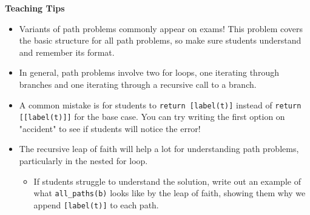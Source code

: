 \begin{guide}
\begin{blocksection}
  \textbf{Teaching Tips}
  \begin{itemize}
      \item Variants of path problems commonly appear on exams! This problem covers the basic structure for all path problems, so make sure students understand and remember its format.
      \item In general, path problems involve two for loops, one iterating through branches and one iterating through a recursive call to a branch.
      \item A common mistake is for students to \lstinline$return [label(t)]$ instead of \lstinline$return [[label(t)]]$ for the base case. You can try writing the first option on "accident" to see if students will notice the error!
      \item The recursive leap of faith will help a lot for understanding path problems, particularly in the nested for loop.
      \begin{itemize}
        \item If students struggle to understand the solution, write out an example of what \lstinline$all_paths(b)$ looks like by the leap of faith, showing them why we append \lstinline$[label(t)]$ to each path.
      \end{itemize}
  \end{itemize}
\end{blocksection}
\end{guide}
